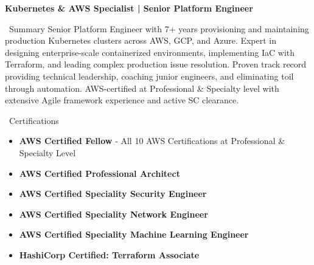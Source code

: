 \documentclass{resume} %
\begin{document}

\begin{center}
{\Large \textbf{Kubernetes \& AWS Specialist | Senior Platform Engineer }}
\end{center}


\begin{rSection}{{\color{sectioncolor}\faUser}\ Summary}
\smallbreak
\normalfont Senior Platform Engineer with 7+ years provisioning and maintaining production Kubernetes clusters across AWS, GCP, and Azure. Expert in designing enterprise-scale containerized environments, implementing IaC with Terraform, and leading complex production issue resolution. Proven track record providing technical leadership, coaching junior engineers, and eliminating toil through automation. AWS-certified at Professional & Specialty level with extensive Agile framework experience and active SC clearance.
\end{rSection}


\begin{rSection}{{\color{certcolor}\faCertificate}\ Certifications}
\begin{itemize}[leftmargin=1em, nosep]
\item \textbf{AWS Certified Fellow} - All 10 AWS Certifications at Professional \& Specialty Level
\item \textbf{AWS Certified Professional Architect}
\item \textbf{AWS Certified Speciality Security Engineer}
\item \textbf{AWS Certified Speciality Network Engineer}
\item \textbf{AWS Certified Speciality Machine Learning Engineer}
\item \textbf{HashiCorp Certified: Terraform Associate}
\end{itemize}
\end{rSection}
\end{document}
